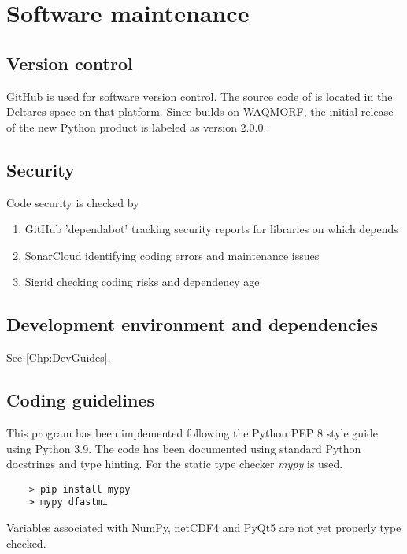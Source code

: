 \chapter{Software maintenance}

\section{Version control}

GitHub is used for software version control.
The \href{https://github.com/Deltares/D-FAST_Morphological_Impact}{source code} of \dfastmi is located in the Deltares space on that platform.
Since \dfastmi builds on WAQMORF, the initial release of the new Python product is labeled as version 2.0.0.

\section{Security}

Code security is checked by
\begin{enumerate}
\item GitHub 'dependabot' tracking security reports for libraries on which \dfmi depends
\item SonarCloud identifying coding errors and maintenance issues
\item Sigrid checking coding risks and dependency age
\end{enumerate}

\section{Development environment and dependencies}

See \autoref{Chp:DevGuides}.

\section{Coding guidelines}

This program has been implemented following the Python PEP 8 style guide using Python 3.9.
The code has been documented using standard Python docstrings and type hinting.
For the static type checker \emph{mypy} is used.

\begin{Verbatim}
    > pip install mypy
    > mypy dfastmi
\end{Verbatim}

Variables associated with NumPy, netCDF4 and PyQt5 are not yet properly type checked.

